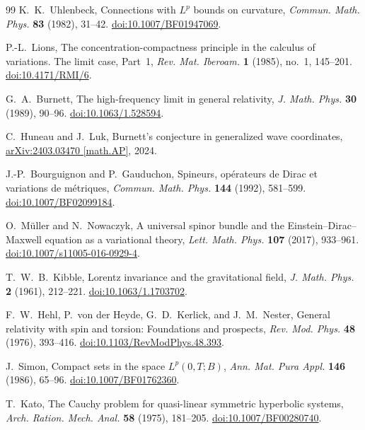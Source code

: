 \documentclass[11pt]{article}
\numberwithin{equation}{section}
\theoremstyle{definition}
\theoremstyle{remark}
\begin{document}
\begin{thebibliography}{99}
K.~K.~Uhlenbeck,
Connections with $L^p$ bounds on curvature,
\emph{Commun. Math. Phys.} \textbf{83} (1982), 31--42.
\href{https://doi.org/10.1007/BF01947069}{doi:10.1007/BF01947069}.

P.-L.~Lions,
The concentration-compactness principle in the calculus of variations.
The limit case, Part~1,
\emph{Rev. Mat. Iberoam.} \textbf{1} (1985), no.~1, 145--201.
\href{https://doi.org/10.4171/RMI/6}{doi:10.4171/RMI/6}.

G.~A.~Burnett,
The high-frequency limit in general relativity,
\emph{J. Math. Phys.} \textbf{30} (1989), 90--96.
\href{https://doi.org/10.1063/1.528594}{doi:10.1063/1.528594}.

C.~Huneau and J.~Luk,
Burnett's conjecture in generalized wave coordinates,
\href{https://arxiv.org/abs/2403.03470}{arXiv:2403.03470 [math.AP]}, 2024.

J.-P.~Bourguignon and P.~Gauduchon,
Spineurs, op\'erateurs de Dirac et variations de m\'etriques,
\emph{Commun. Math. Phys.} \textbf{144} (1992), 581--599.
\href{https://doi.org/10.1007/BF02099184}{doi:10.1007/BF02099184}.

O.~M\"uller and N.~Nowaczyk,
A universal spinor bundle and the Einstein--Dirac--Maxwell equation as a variational theory,
\emph{Lett. Math. Phys.} \textbf{107} (2017), 933--961.
\href{https://doi.org/10.1007/s11005-016-0929-4}{doi:10.1007/s11005-016-0929-4}.

T.~W.~B.~Kibble,
Lorentz invariance and the gravitational field,
\emph{J. Math. Phys.} \textbf{2} (1961), 212--221.
\href{https://doi.org/10.1063/1.1703702}{doi:10.1063/1.1703702}.

F.~W.~Hehl, P.~von der Heyde, G.~D.~Kerlick, and J.~M.~Nester,
General relativity with spin and torsion: Foundations and prospects,
\emph{Rev. Mod. Phys.} \textbf{48} (1976), 393--416.
\href{https://doi.org/10.1103/RevModPhys.48.393}{doi:10.1103/RevModPhys.48.393}.

J.~Simon,
Compact sets in the space $L^p(0,T;B)$,
\emph{Ann. Mat. Pura Appl.} \textbf{146} (1986), 65--96.
\href{https://doi.org/10.1007/BF01762360}{doi:10.1007/BF01762360}.

T.~Kato,
The Cauchy problem for quasi-linear symmetric hyperbolic systems,
\emph{Arch. Ration. Mech. Anal.} \textbf{58} (1975), 181--205.
\href{https://doi.org/10.1007/BF00280740}{doi:10.1007/BF00280740}.


\end{thebibliography}
\end{document}
